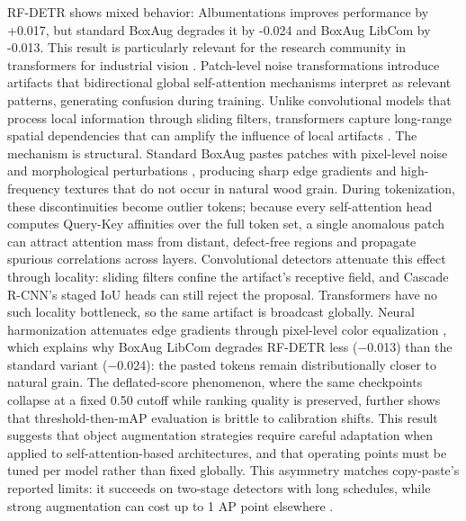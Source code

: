 \documentclass[pdflatex,sn-basic,Numbered,iicol]{sn-jnl}
\begin{document}
RF-DETR shows mixed behavior: Albumentations improves performance by +0.017, but standard BoxAug degrades it by -0.024 and BoxAug LibCom by -0.013. This result is particularly relevant for the research community in transformers for industrial vision \citep{hutten2022vision}. Patch-level noise transformations introduce artifacts that bidirectional global self-attention mechanisms interpret as relevant patterns, generating confusion during training. Unlike convolutional models that process local information through sliding filters, transformers capture long-range spatial dependencies that can amplify the influence of local artifacts \citep{zhao2023detrs}. The mechanism is structural. Standard BoxAug pastes patches with pixel-level noise and morphological perturbations \citep{LEE2022104138}, producing sharp edge gradients and high-frequency textures that do not occur in natural wood grain. During tokenization, these discontinuities become outlier tokens; because every self-attention head computes Query-Key affinities over the full token set, a single anomalous patch can attract attention mass from distant, defect-free regions and propagate spurious correlations across layers. Convolutional detectors attenuate this effect through locality: sliding filters confine the artifact's receptive field, and Cascade R-CNN's staged IoU heads can still reject the proposal. Transformers have no such locality bottleneck, so the same artifact is broadcast globally. Neural harmonization \citep{cong2021bargainnet} attenuates edge gradients through pixel-level color equalization \citep{Guerreiro_2023_CVPR}, which explains why BoxAug LibCom degrades RF-DETR less ($-$0.013) than the standard variant ($-$0.024): the pasted tokens remain distributionally closer to natural grain. The deflated-score phenomenon, where the same checkpoints collapse at a fixed 0.50 cutoff while ranking quality is preserved, further shows that threshold-then-mAP evaluation is brittle to calibration shifts. This result suggests that object augmentation strategies require careful adaptation when applied to self-attention-based architectures, and that operating points must be tuned per model rather than fixed globally. This asymmetry matches copy-paste's reported limits: it succeeds on two-stage detectors with long schedules, while strong augmentation can cost up to 1 AP point elsewhere \citep{ghiasi2021simple}.
\end{document}
